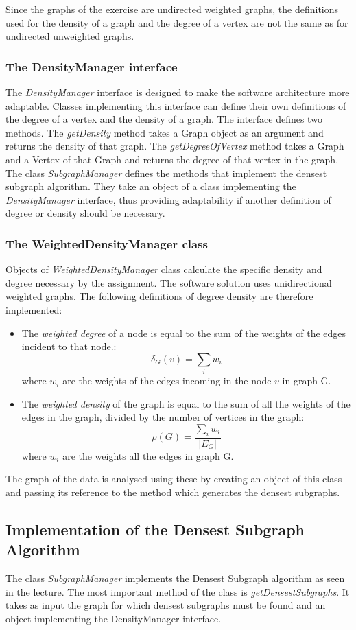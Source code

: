 \documentclass[10pt,a4paper]{article}
\begin{document}
Since the graphs of the exercise are undirected weighted graphs, the definitions used for the density of a graph and the degree of a vertex are not the same as for undirected unweighted graphs.

\subsubsection{The DensityManager interface}
The \emph{DensityManager} interface is designed to make the software architecture more adaptable. Classes implementing this interface can define their own definitions of the degree of a vertex and the density of a graph. The interface defines two methods. The \emph{getDensity} method takes a Graph object as an argument and returns the density of that graph. The \emph{getDegreeOfVertex} method takes a Graph and a Vertex of that Graph and returns the degree of that vertex in the graph.\\
The class \emph{SubgraphManager} defines the methods that implement the densest subgraph algorithm. They take an object of a class implementing the \emph{DensityManager} interface, thus providing adaptability if another definition of degree or density should be necessary.
\subsubsection{The WeightedDensityManager class}
Objects of \emph{WeightedDensityManager} class calculate the specific density and degree necessary by the assignment. The software solution uses unidirectional weighted graphs. The following definitions of degree density are therefore implemented:
\begin{itemize}
	\item  The \emph{weighted degree} of a node is equal to the sum of the weights of the edges incident to that node.:
$$\delta_{G}(v)=\sum_i{w_{i}}$$
where $w_i$ are the weights of the edges incoming in the node $v$	in graph G. \item The \emph{weighted density} of the graph is equal to the sum of all the weights of the edges in the graph, divided by the number of vertices in the graph:
$$\rho(G)=\dfrac{\sum_i{w_{i}}}{\left|E_G\right|}$$
where $w_i$ are the weights all the edges in graph G. 	
\end{itemize}
The graph of the data is analysed using these by creating an object of this class and passing its reference to the method which generates the densest subgraphs.

\subsection{Implementation of the Densest Subgraph Algorithm}
The class \emph{SubgraphManager} implements the Densest Subgraph algorithm as seen in the lecture. The most important method of the class is \emph{getDensestSubgraphs}. It takes as input the graph for which densest subgraphs must be found and an object implementing the DensityManager interface.
\end{document}
